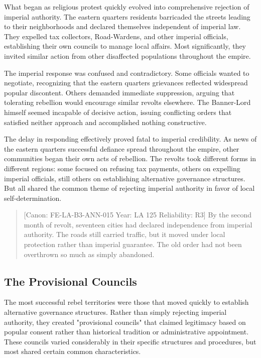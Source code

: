 What began as religious protest quickly evolved into comprehensive
rejection of imperial authority. The eastern quarter\textquotesingle s
residents barricaded the streets leading to their neighborhoods and
declared themselves independent of imperial law. They expelled tax
collectors, Road-Wardens, and other imperial officials, establishing
their own councils to manage local affairs. Most significantly, they
invited similar action from other disaffected populations throughout the
empire.

The imperial response was confused and contradictory. Some officials
wanted to negotiate, recognizing that the eastern
quarter\textquotesingle s grievances reflected widespread popular
discontent. Others demanded immediate suppression, arguing that
tolerating rebellion would encourage similar revolts elsewhere. The
Banner-Lord himself seemed incapable of decisive action, issuing
conflicting orders that satisfied neither approach and accomplished
nothing constructive.

The delay in responding effectively proved fatal to imperial
credibility. As news of the eastern quarter\textquotesingle s successful
defiance spread throughout the empire, other communities began their own
acts of rebellion. The revolts took different forms in different
regions: some focused on refusing tax payments, others on expelling
imperial officials, still others on establishing alternative governance
structures. But all shared the common theme of rejecting imperial
authority in favor of local self-determination.

\begin{quote}
{[}Canon: FE-LA-B3-ANN-015 \textbar{} Year: LA 125 \textbar{}
Reliability: R3{]} By the second month of revolt, seventeen cities had
declared independence from imperial authority. The roads still carried
traffic, but it moved under local protection rather than imperial
guarantee. The old order had not been overthrown so much as simply
abandoned.
\end{quote}

\subsection{The Provisional Councils}\label{the-provisional-councils}

The most successful rebel territories were those that moved quickly to
establish alternative governance structures. Rather than simply
rejecting imperial authority, they created "provisional councils" that
claimed legitimacy based on popular consent rather than historical
tradition or administrative appointment. These councils varied
considerably in their specific structures and procedures, but most
shared certain common characteristics.

